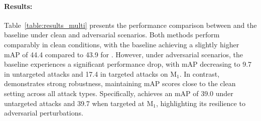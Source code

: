 \paragraph{Results:} Table~\ref{table:results_multi} presents the performance comparison between \name{} and the baseline under clean and adversarial scenarios. Both methods perform comparably in clean conditions, with the baseline achieving a slightly higher mAP of 44.4 compared to 43.9 for \name{}. However, under adversarial scenarios, the baseline experiences a significant performance drop, with mAP decreasing to 9.7 in untargeted attacks and 17.4 in targeted attacks on M\(_1\). In contrast, \name{} demonstrates strong robustness, maintaining mAP scores close to the clean setting across all attack types. Specifically, \name{} achieves an mAP of 39.0 under untargeted attacks and 39.7 when targeted at M\(_1\), highlighting its resilience to adversarial perturbations.


